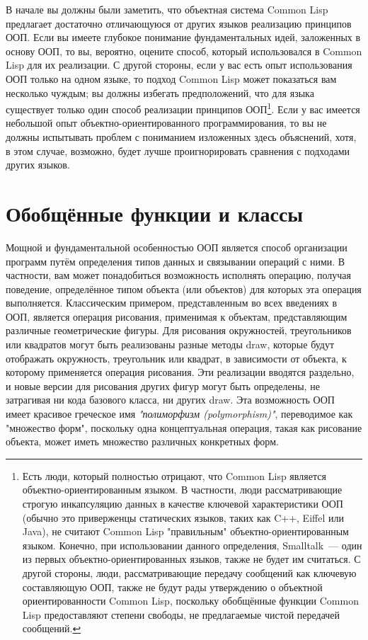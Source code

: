 В начале вы должны были заметить, что объектная система Common Lisp предлагает достаточно
отличающуюся от других языков реализацию принципов ООП. Если вы имеете глубокое понимание
фундаментальных идей, заложенных в основу ООП, то вы, вероятно, оцените способ, который
использовался в Common Lisp для их реализации.  С другой стороны, если у вас есть опыт
использования ООП только на одном языке, то подход Common Lisp может показаться вам
несколько чуждым; вы должны избегать предположений, что для языка существует только один
способ реализации принципов ООП\footnote{Есть люди, который полностью отрицают, что Common
  Lisp является объектно-ориентированным языком.  В частности, люди рассматривающие
  строгую инкапсуляцию данных в качестве ключевой характеристики ООП (обычно это
  приверженцы статических языков, таких как C++, Eiffel или Java), не считают Common Lisp
  "правильным" объектно-ориентированным языком.  Конечно, при использовании данного
  определения, Smalltalk~--- один из первых объектно-ориентированных языков, также не будет
  им считаться.  С другой стороны, люди, рассматривающие передачу сообщений как ключевую
  составляющую ООП, также не будут рады утверждению о объектной ориентированности Common
  Lisp, поскольку обобщённые функции Common Lisp предоставляют степени свободы, не
  предлагаемые чистой передачей сообщений.}.  Если у вас имеется небольшой опыт
объектно-ориентированного программирования, то вы не должны испытывать проблем с
пониманием изложенных здесь объяснений, хотя, в этом случае, возможно, будет лучше
проигнорировать сравнения с подходами других языков.

\section{Обобщённые функции и классы}

Мощной и фундаментальной особенностью ООП является способ организации программ путём
определения типов данных и связывании операций с ними.  В частности, вам может
понадобиться возможность исполнять операцию, получая поведение, определённое типом объекта
(или объектов) для которых эта операция выполняется. Классическим примером, представленным
во всех введениях в ООП, является операция рисования, применимая к объектам,
представляющим различные геометрические фигуры.  Для рисования окружностей, треугольников
или квадратов могут быть реализованы разные методы draw, которые будут отображать
окружность, треугольник или квадрат, в зависимости от объекта, к которому применяется
операция рисования. Эти реализации вводятся раздельно, и новые версии для рисования других
фигур могут быть определены, не затрагивая ни кода базового класса, ни других draw.  Эта
возможность ООП имеет красивое греческое имя \textit{"полиморфизм (polymorphism)"},
переводимое как "множество форм", поскольку одна концептуальная операция, такая как
рисование объекта, может иметь множество различных конкретных форм.

